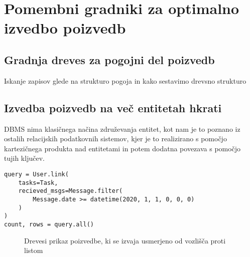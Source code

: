 \documentclass[a4paper,12pt,openright]{book}
\begin{document}
    \section{Pomembni gradniki za optimalno izvedbo poizvedb}
        \subsection{Gradnja dreves za pogojni del poizvedb}
        \colorbox{BurntOrange}{Iskanje zapisov glede na strukturo pogoja in kako sestavimo drevsno strukturo}
        
        \subsection{Izvedba poizvedb na več entitetah hkrati}
            DBMS nima klasičnega načina združevanja entitet, kot nam je to poznano iz ostalih relacijskih podatkovnih sistemov, kjer je to realizirano s pomočjo kartezičnega produkta nad entitetami in potem dodatna povezava s pomočjo tujih ključev.
            
\begin{verbatim}
query = User.link(
    tasks=Task,
    recieved_msgs=Message.filter(
        Message.date >= datetime(2020, 1, 1, 0, 0, 0)
    )
)
count, rows = query.all()
\end{verbatim}
                    
        \begin{figure}[h]
            \begin{center}
              \caption{Drevesi prikaz poizvedbe, ki se izvaja usmerjeno od vozlišča proti listom}
            \end{center}
            \end{figure}
        
\end{document}

